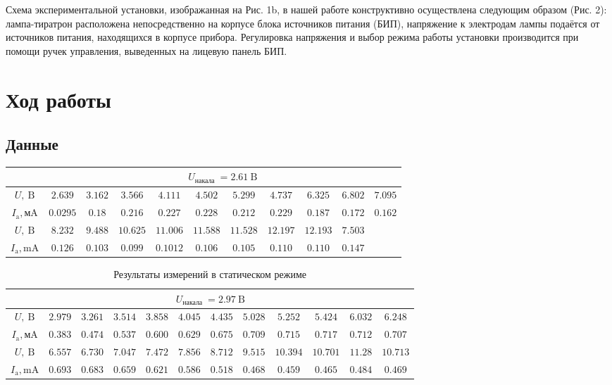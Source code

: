 \documentclass[a4paper, 12pt]{article}%
\begin{document}
Схема экспериментальной установки, изображанная на Рис. 1b, в нашей работе конструктивно осуществлена следующим образом (Рис. 2): лампа-тиратрон расположена непосредственно на корпусе блока источников питания (БИП), напряжение к электродам лампы подаётся от источников питания, находящихся в корпусе прибора. Регулировка напряжения и выбор режима работы установки производится при помощи ручек управления, выведенных на лицевую панель БИП.

\newpage

\section{Ход работы}

\subsection{Данные}



\begin{table}[!h] 
		\begin{tabular}{|c|c|c|c|c|c|c|c|c|c|c|}
\hline & \multicolumn{10}{|c|}{$U_{\text {накала }}=2.61 \mathrm{~B}$}\\
\hline$U, \mathrm{~B}$ & $2.639$ & $3.162$ & $3.566$ & $4.111$ & $4.502$ & $5.299$ & $4.737$ & $6.325$ & $6.802$ & $7.095$\\
$I_{\mathrm{a}}, \mathrm{мA}$ & $0.0295$ & $0.18$ & $0.216$ & $0.227$ & $0.228$ & $0.212$ & $0.229$ & $0.187$ & $0.172$ & $0.162$ \\
\hline$U, \mathrm{~B}$ & $8.232$ & $9.488$ & $10.625$ & $11.006$ & $11.588$ & $11.528$ & $12.197$ & $12.193$ & $7.503$  &  \\
$I_{\mathrm{a}}, \mathrm{mA}$ & $0.126$ & $0.103$ & $0.099$ & $0.1012$ & $0.106$ & $0.105$ & $0.110$ & $0.110$ & $0.147$ & \\
\hline
	\end{tabular}
\end{table}

\begin{table}[!h]
		\begin{tabular}{|c|c|c|c|c|c|c|c|c|c|c|c|}
\hline & \multicolumn{10}{|c|}{$U_{\text {накала }}=2.97 \mathrm{~B}$} &\\
\hline$U, \mathrm{~B}$ & $2.979$ & $3.261$ & $3.514$ & $3.858$ & $4.045$ & $4.435$ & $5.028$ & $5.252$ & $5.424$ & $6.032$ & $6.248$ \\
$I_{\mathrm{a}}, \mathrm{мA}$ & $0.383$ & $0.474$ & $0.537$ & $0.600$ & $0.629$ & $0.675$ & $0.709$ & $0.715$ & $0.717$ & $0.712$ & $0.707$ \\

\hline$U, \mathrm{~B}$ & $6.557$ & $6.730$ & $7.047$ & $7.472$ & $7.856$ & $8.712$ & $9.515$ & $10.394$ & $10.701$ & $ 11.28$ & $10.713$\\
$I_{\mathrm{a}}, \mathrm{mA}$ & $0.693$ & $0.683$ & $0.659$ & $0.621$ & $0.586$ & $0.518$ & $0.468$ & $0.459$ & $0.465$ & $0.484$ & $0.469$\\
\hline
	\end{tabular}
\caption{Результаты измерений в статическом режиме}
\end{table} 
\end{document}
